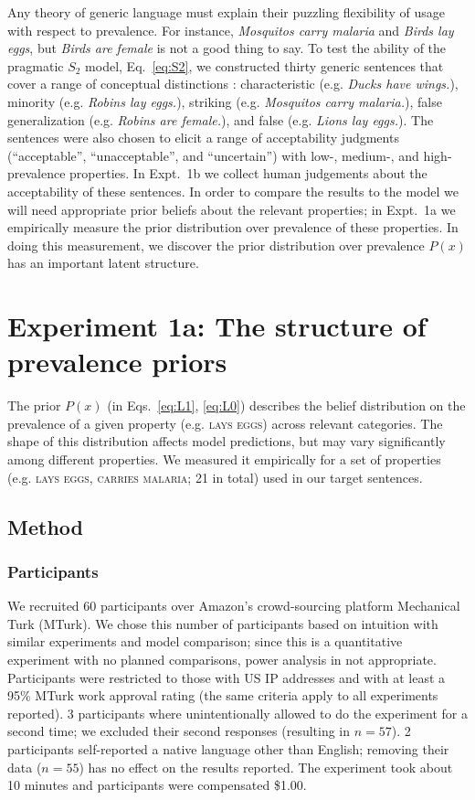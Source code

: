 \documentclass[12pt,letterpaper]{article}
\begin{document}
Any theory of generic language must explain their puzzling flexibility of usage with respect to prevalence.
For instance, \emph{Mosquitos carry malaria} and \emph{Birds lay eggs}, but \emph{Birds are female} is not a good thing to say.
To test the ability of the pragmatic $S_2$ model, Eq.~\ref{eq:S2}, we constructed thirty generic sentences 
that cover a range of conceptual distinctions  \cite{Prasada2013}: characteristic (e.g. \emph{Ducks have wings.}), minority (e.g. \emph{Robins lay eggs.}), striking (e.g. \emph{Mosquitos carry malaria.}), false generalization (e.g. \emph{Robins are female.}), and false (e.g. \emph{Lions lay eggs.}).
The sentences were also chosen to elicit a range of acceptability judgments (``acceptable'', ``unacceptable'', and ``uncertain'') with low-, medium-, and high-prevalence properties.
In Expt.~1b we collect human judgements about the acceptability of these sentences. 
In order to compare the results to the model we will need appropriate prior beliefs about the relevant properties; 
in Expt.~1a we empirically measure the prior distribution over prevalence of these properties.
In doing this measurement, we discover the prior distribution over prevalence $P(x)$ has an important latent structure.

\section*{Experiment 1a: The structure of prevalence priors}

 The prior $P(x)$ (in Eqs.~\ref{eq:L1}, \ref{eq:L0}) describes the belief distribution on the prevalence of a given property (e.g. \textsc{lays eggs}) across relevant categories. 
The shape of this distribution affects model predictions, but may vary significantly among different properties.
 We measured it empirically for a set of properties (e.g. \textsc{lays eggs, carries malaria}; 21 in total) used in our target sentences. 
 
\subsection*{Method}

\subsubsection*{Participants}
We recruited 60 participants over Amazon's crowd-sourcing platform Mechanical Turk (MTurk).  
We chose this number of participants based on intuition with similar experiments and model comparison; 
since this is a quantitative experiment with no planned comparisons, power analysis in not appropriate.
Participants were restricted to those with US IP addresses and with at least a 95\% MTurk work approval rating (the same criteria apply to all experiments reported). 
3 participants where unintentionally allowed to do the experiment for a second time; we excluded their second responses (resulting in $n=57$).
2 participants self-reported a native language other than English; removing their data ($n=55$) has no effect on the results reported. 
The experiment took about 10 minutes and participants were compensated \$1.00.
\end{document}
